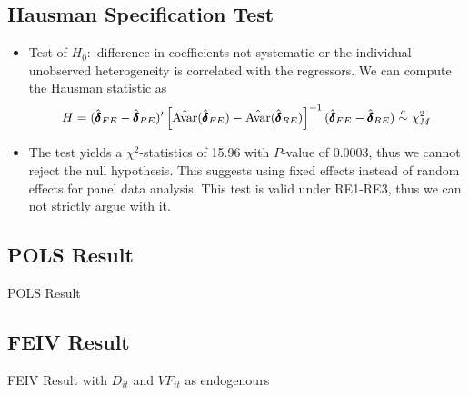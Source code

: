 \documentclass[
11pt,notheorems,compress,hyperref={pdfauthor=Maghfira Ramadhani}
]{beamer}
\begin{document}
\subsection{Hausman Specification Test}
\begin{frame}
\label{hausmanspec}
\begin{itemize}
    \item Test of $H_0:$ difference in coefficients not systematic or the individual unobserved heterogeneity is correlated with the regressors. We can compute the Hausman statistic as \begin{equation*}
        H=(\hat{\pmb{\delta}}_{FE}-\hat{\pmb{\delta}}_{RE})'\left[\hat{\Av}(\hat{\pmb{\delta}}_{FE})-\hat{\Av}(\hat{\pmb{\delta}}_{RE})\right]^{-1}(\hat{\pmb{\delta}}_{FE}-\hat{\pmb{\delta}}_{RE}) \asym \chi_M^2 \end{equation*}
    \item The test yields a $\chi^2$-statistics of 15.96 with $P$-value of 0.0003, thus we cannot reject the null hypothesis. This suggests using fixed effects instead of random effects for panel data analysis. This test is valid under RE1-RE3, thus we can not strictly argue with it.\hyperlink{hausmanclick}{}
\end{itemize}
\end{frame}

\subsection{POLS Result}
\begin{frame}
\label{POLS}
    \begin{table}[h]
    \caption{POLS Result \hyperlink{POLSclick}{}}
    \scalebox{0.8}{}    
    \end{table}
\end{frame}

\subsection{FEIV Result}
\begin{frame}
\label{FEIV}
    \begin{table}[h]
    \caption{FEIV Result with $D_{it}$ and $VF_{it}$ as endogenours \hyperlink{FEIVclick}{}}
    \scalebox{0.8}{}    
    \end{table}
\end{frame}
\end{document}

